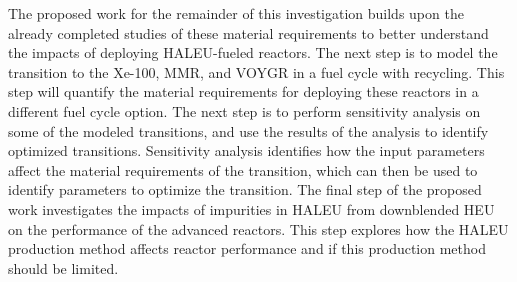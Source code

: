 The proposed work for the remainder of this investigation builds upon 
the already completed studies of these material requirements to 
better understand the impacts of deploying 
\gls{HALEU}-fueled reactors. The next step is to model the transition to 
the Xe-100, \gls{MMR}, and VOYGR in a fuel cycle with recycling. This 
step will 
quantify the material requirements for deploying these reactors in 
a different fuel cycle option. The next step is to perform sensitivity 
analysis on some of the modeled transitions, and use the results of 
the analysis to identify optimized transitions. Sensitivity analysis 
identifies how the input parameters affect 
the material requirements of the transition, which can then be used to 
identify parameters to optimize the transition. The final step of the 
proposed work investigates the impacts of impurities in 
\gls{HALEU} from downblended \gls{HEU} on the performance of the 
advanced reactors. This step explores how the \gls{HALEU} production 
method affects reactor performance and if this production method 
should be limited. 
